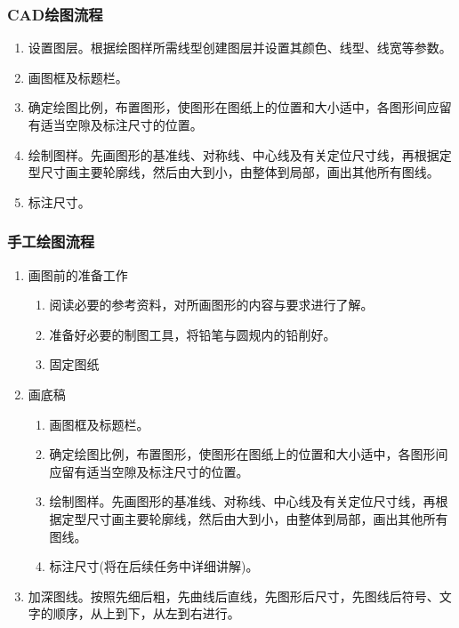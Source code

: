
\subsubsection{CAD绘图流程}
\begin{enumerate}
\item 设置图层。根据绘图样所需线型创建图层并设置其颜色、线型、线宽等参数。
\item 画图框及标题栏。
\item 确定绘图比例，布置图形，使图形在图纸上的位置和大小适中，各图形间应留有适当空隙及标注尺寸的位置。
\item 绘制图样。先画图形的基准线、对称线、中心线及有关定位尺寸线，再根据定型尺寸画主要轮廓线，然后由大到小，由整体到局部，画出其他所有图线。
\item 标注尺寸。
\end{enumerate}
\subsubsection{手工绘图流程}
\begin{enumerate}
\item 画图前的准备工作
    \begin{enumerate}
    \item 阅读必要的参考资料，对所画图形的内容与要求进行了解。
    \item 准备好必要的制图工具，将铅笔与圆规内的铅削好。
    \item 固定图纸
    \end{enumerate}
\item 画底稿
\begin{enumerate}
\item 画图框及标题栏。
\item 确定绘图比例，布置图形，使图形在图纸上的位置和大小适中，各图形间应留有适当空隙及标注尺寸的位置。
\item 绘制图样。先画图形的基准线、对称线、中心线及有关定位尺寸线，再根据定型尺寸画主要轮廓线，然后由大到小，由整体到局部，画出其他所有图线。
\item 标注尺寸(将在后续任务中详细讲解)。
\end{enumerate}
\item 加深图线。按照先细后粗，先曲线后直线，先图形后尺寸，先图线后符号、文字的顺序，从上到下，从左到右进行。

\end{enumerate}

\endinput
